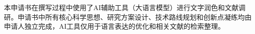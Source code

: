 本申请书在撰写过程中使用了AI辅助工具（大语言模型）进行文字润色和文献调研。申请书中所有核心科学思想、研究方案设计、技术路线规划和创新点凝练均由申请人独立完成，AI工具仅用于语言表达的优化和相关文献的检索整理。
